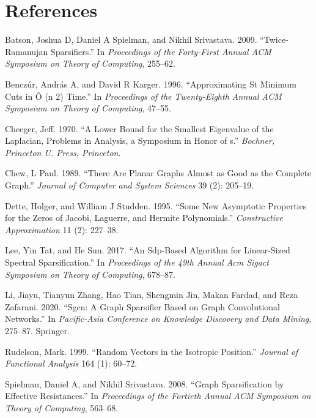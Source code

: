 \documentclass[
  letterpaper,
  DIV=11,
  numbers=noendperiod]{scrartcl}
\newlength{\cslhangindent}
\newlength{\cslentryspacingunit} %
\newenvironment{CSLReferences}[2] %
 {%
  \setlength{\parindent}{0pt}
  \ifodd #1
  \let\oldpar\par
  \def\par{\hangindent=\cslhangindent\oldpar}
  \fi
  \setlength{\parskip}{#2\cslentryspacingunit}
 }%
 {}
\theoremstyle{plain}
\theoremstyle{plain}
\theoremstyle{plain}
\theoremstyle{definition}
\theoremstyle{plain}
\theoremstyle{remark}
\begin{document}
\section{References}
\hypertarget{refs}{}
\begin{CSLReferences}{1}{0}
\leavevmode{}%
Batson, Joshua D, Daniel A Spielman, and Nikhil Srivastava. 2009.
{``Twice-Ramanujan Sparsifiers.''} In \emph{Proceedings of the
Forty-First Annual ACM Symposium on Theory of Computing}, 255--62.

\leavevmode{}%
Benczúr, András A, and David R Karger. 1996. {``Approximating St Minimum
Cuts in {Õ} (n 2) Time.''} In \emph{Proceedings of the Twenty-Eighth
Annual ACM Symposium on Theory of Computing}, 47--55.

\leavevmode{}%
Cheeger, Jeff. 1970. {``A Lower Bound for the Smallest Eigenvalue of the
Laplacian, Problems in Analysis, a Symposium in Honor of s.''}
\emph{Bochner, Princeton U. Press, Princeton}.

\leavevmode{}%
Chew, L Paul. 1989. {``There Are Planar Graphs Almost as Good as the
Complete Graph.''} \emph{Journal of Computer and System Sciences} 39
(2): 205--19.

\leavevmode{}%
Dette, Holger, and William J Studden. 1995. {``Some New Asymptotic
Properties for the Zeros of Jacobi, Laguerre, and Hermite
Polynomials.''} \emph{Constructive Approximation} 11 (2): 227--38.

\leavevmode{}%
Lee, Yin Tat, and He Sun. 2017. {``An Sdp-Based Algorithm for
Linear-Sized Spectral Sparsification.''} In \emph{Proceedings of the
49th Annual Acm Sigact Symposium on Theory of Computing}, 678--87.

\leavevmode{}%
Li, Jiayu, Tianyun Zhang, Hao Tian, Shengmin Jin, Makan Fardad, and Reza
Zafarani. 2020. {``Sgcn: A Graph Sparsifier Based on Graph Convolutional
Networks.''} In \emph{Pacific-Asia Conference on Knowledge Discovery and
Data Mining}, 275--87. Springer.

\leavevmode{}%
Rudelson, Mark. 1999. {``Random Vectors in the Isotropic Position.''}
\emph{Journal of Functional Analysis} 164 (1): 60--72.

\leavevmode{}%
Spielman, Daniel A, and Nikhil Srivastava. 2008. {``Graph Sparsification
by Effective Resistances.''} In \emph{Proceedings of the Fortieth Annual
ACM Symposium on Theory of Computing}, 563--68.


\end{CSLReferences}
\end{document}
